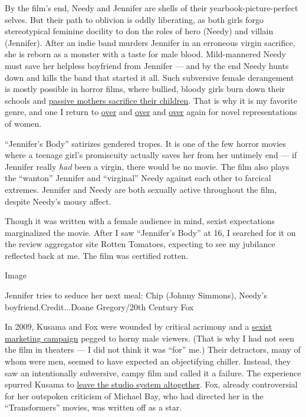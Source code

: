 By the film's end, Needy and Jennifer are shells of their
yearbook-picture-perfect selves. But their path to oblivion is oddly
liberating, as both girls forgo stereotypical feminine docility to don
the roles of hero (Needy) and villain (Jennifer). After an indie band
murders Jennifer in an erroneous virgin sacrifice, she is reborn as a
monster with a taste for male blood. Mild-mannered Needy must save her
helpless boyfriend from Jennifer --- and by the end Needy hunts down and
kills the band that started it all. Such subversive female derangement
is mostly possible in horror films, where bullied, bloody girls burn
down their schools and
\href{https://www.nytimes.com/2020/02/12/movies/the-lodge-bad-mothers.html}{passive
mothers sacrifice their children}. That is why it is my favorite genre,
and one I return to
\href{https://www.nytimes.com/2019/12/16/opinion/black-christmas-movie.html}{over}
and
\href{https://slate.com/culture/2018/06/metoo-produces-more-horror-movies-where-young-women-bite-back.html}{over}
and
\href{https://seventh-row.com/2020/02/24/isabelle-adjani-possession/}{over}
again for novel representations of women.

``Jennifer's Body'' satirizes gendered tropes. It is one of the few
horror movies where a teenage girl's promiscuity actually saves her from
her untimely end --- if Jennifer really \emph{had} been a virgin, there
would be no movie. The film also plays the ``wanton'' Jennifer and
``virginal'' Needy against each other to farcical extremes. Jennifer and
Needy are both sexually active throughout the film, despite Needy's
mousy affect.

Though it was written with a female audience in mind, sexist
expectations marginalized the movie. After I saw ``Jennifer's Body'' at
16, I searched for it on the review aggregator site Rotten Tomatoes,
expecting to see my jubilance reflected back at me. The film was
certified rotten.

Image

Jennifer tries to seduce her next meal: Chip (Johnny Simmons), Needy's
boyfriend.Credit...Doane Gregory/20th Century Fox

In 2009, Kusama and Fox were wounded by critical acrimony and a
\href{https://www.indiewire.com/2018/12/karyn-kusama-jennifers-body-marketing-misogynistic-1202026860/}{sexist
marketing campaign} pegged to horny male viewers. (That is why I had not
seen the film in theaters --- I did not think it was ``for'' me.) Their
detractors, many of whom were men, seemed to have expected an
objectifying chiller. Instead, they saw an intentionally subversive,
campy film and called it a failure. The experience spurred Kusama to
\href{https://www.nytimes.com/2018/12/20/magazine/destroyer-movie-karyn-kusama.html}{leave
the studio system altogether}. Fox, already controversial for her
outspoken criticism of Michael Bay, who had directed her in the
``Transformers'' movies, was written off as a star.

